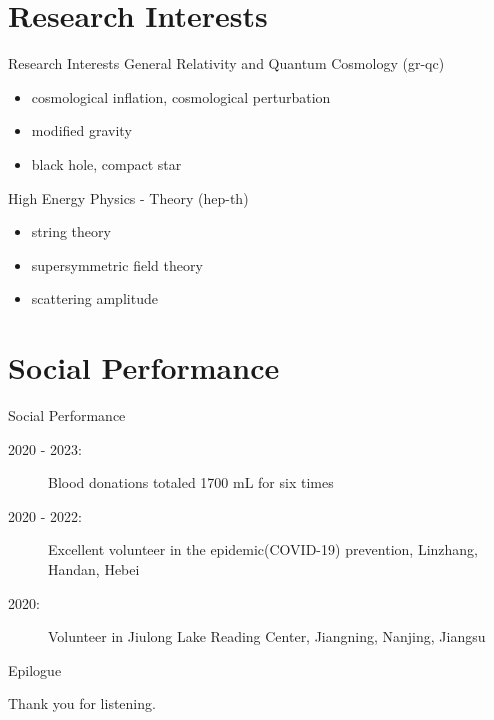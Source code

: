 \documentclass[9pt,aspectratio=169,hyperref=colorlinks]{beamer}
\begin{document}
\section{Research Interests}
\begin{frame}{Research Interests}
    General Relativity and Quantum Cosmology (gr-qc)
    \begin{itemize}
        \item cosmological inflation, cosmological perturbation
        \item modified gravity
        \item black hole, compact star
    \end{itemize}

    High Energy Physics - Theory (hep-th)
    \begin{itemize}
        \item string theory
        \item supersymmetric field theory
        \item scattering amplitude
    \end{itemize}
\end{frame}

\section{Social Performance}
\begin{frame}{Social Performance}
    \begin{description}
        \item[2020 - 2023:] Blood donations totaled 1700 mL for six times
        \item[2020 - 2022:] Excellent volunteer in the epidemic(COVID-19) prevention, Linzhang, Handan, Hebei
        \item[2020:] Volunteer in Jiulong Lake Reading Center, Jiangning, Nanjing, Jiangsu
    \end{description}
\end{frame}

\begin{frame}{Epilogue}

    {\Huge \calligra Thank you for listening.}

\end{frame}
\end{document}

